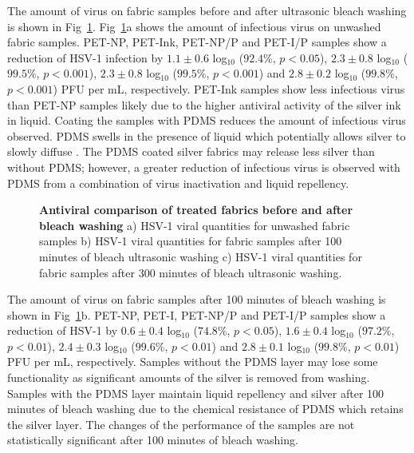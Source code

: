 \documentclass[10pt,letterpaper]{article}
\begin{document}
The amount of virus on fabric samples before and after ultrasonic bleach washing is shown in Fig~\ref{fig5}. Fig~\ref{fig5}a shows the amount of infectious virus on unwashed fabric samples. PET-NP, PET-Ink, PET-NP/P and PET-I/P samples show a reduction of HSV-1 infection by $1.1 \pm 0.6$ log$_{10}$ ($92.4 %
\%$, $p < 0.05$), $2.3 \pm 0.8$ log$_{10}$ ($99.5 %
\%$, $p < 0.001$), $2.3 \pm 0.8$  log$_{10}$ ($99.5 %
\%$, $p < 0.001$) and $2.8 \pm 0.2$ log$_{10}$ ($99.8 %
\%$, $p < 0.001$) PFU per mL, respectively. 
PET-Ink samples show less infectious virus than PET-NP samples likely due to the higher antiviral activity of the silver ink in liquid. Coating the samples with PDMS reduces the amount of infectious virus observed.
PDMS swells in the presence of liquid which potentially allows silver to slowly diffuse \cite{bian_2021,faupel:1998,ahmad_2021,dastjerdi:2009}.
The PDMS coated silver fabrics may release less silver than without PDMS; however, a greater reduction of infectious virus is observed with PDMS from a combination of virus inactivation and liquid repellency.  

\begin{figure}[!h]
\caption{{\bf Antiviral comparison of treated fabrics before and after bleach washing}{
a) HSV-1 viral quantities for unwashed fabric samples b) HSV-1 viral quantities for fabric samples after 100 minutes of bleach ultrasonic washing c) HSV-1 viral quantities for fabric samples after 300 minutes of bleach ultrasonic washing.}}
\label{fig5}
\end{figure}


The amount of virus on fabric samples after 100 minutes of bleach washing is shown in Fig~\ref{fig5}b. PET-NP, PET-I, PET-NP/P and PET-I/P samples show a reduction of HSV-1 by $0.6 \pm 0.4$ log$_{10}$ ($74.8 %
\%$, $p < 0.05$), $1.6 \pm 0.4$ log$_{10}$ ($97.2 %
\%$, $p < 0.01$), $2.4 \pm 0.3$ log$_{10}$ ($99.6 %
\%$, $p < 0.01$) and $2.8 \pm 0.1$ log$_{10}$ ($99.8 %
\%$, $p < 0.01$) PFU per mL,  respectively. Samples without the PDMS layer may lose some functionality as significant amounts of the silver is removed from washing. Samples with the PDMS layer maintain liquid repellency and silver after 100 minutes of bleach washing due to the chemical resistance of PDMS which retains the silver layer. The changes of the performance of the samples are not statistically significant after 100 minutes of bleach washing.
\end{document}
